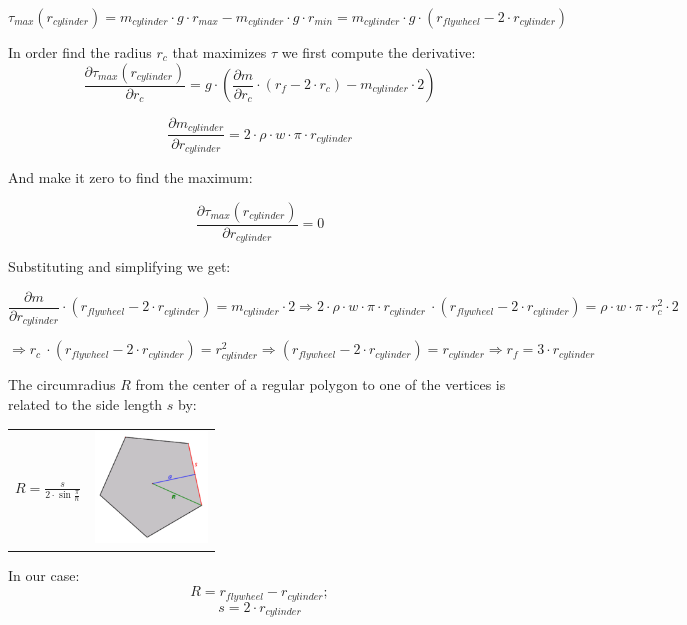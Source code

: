 \[ \tau _{max} (r_{cylinder}) =  m_{cylinder} \cdot g \cdot r_{max} -  m_{cylinder} \cdot g \cdot r_{min} =
	m_{cylinder}\cdot g \cdot (r_{flywheel} - 2 \cdot r_{cylinder}) \]

In order find the radius $r_c$ that maximizes $\tau$ we first compute the derivative:
\[\frac{\partial \tau _{max} (r_{cylinder})}{\partial r_c} = g \cdot(\frac{\partial m}{\partial r_c} \cdot (r_f - 2 \cdot r_c) -  m_{cylinder} \cdot 2)\]

\[ \frac{\partial  m_{cylinder}}{\partial r_{cylinder}} = 2 \cdot \rho \cdot w \cdot \pi \cdot  r_{cylinder}\]

And make it zero to find the maximum:

\[\frac{\partial \tau _{max} (r_{cylinder})}{\partial r_{cylinder}} = 0\]

Substituting and simplifying we get:

\[\frac{\partial m}{\partial r_{cylinder}} \cdot (r_{flywheel} - 2 \cdot r_{cylinder}) =
	m_{cylinder} \cdot 2 \Rightarrow 2 \cdot \rho \cdot w \cdot \pi \cdot  r_{cylinder}\ \cdot (r_{flywheel} - 2 \cdot r_{cylinder}) = \rho \cdot w \cdot \pi \cdot r_c^2 \cdot 2 \]

\[ \Rightarrow r_c\ \cdot (r_{flywheel} - 2 \cdot r_{cylinder}) =  r_{cylinder}^2
	\Rightarrow (r_{flywheel} - 2 \cdot r_{cylinder}) =  r_{cylinder}
	\Rightarrow \boxed{r_f = 3 \cdot r_{cylinder}}\]


The circumradius $R$ from the center of a regular polygon to one of the vertices is related to the side length $s$ by:

\begin{center}
	\begin{tabular}{ c  c }
		\(\displaystyle R=\frac {s}{2\cdot \sin{\frac {\pi} {n}}} \)
		 &
		\includegraphics[width=3cm]{img/PolygonParameters.png}
	\end{tabular}
\end{center}

In our case:
\[ R = r_{flywheel} - r_{cylinder}; \]
\[ s = 2 \cdot r_{cylinder}\]

